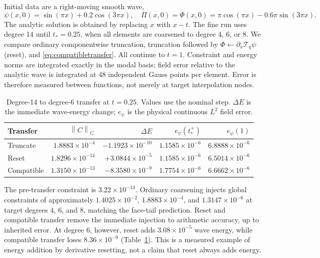 \documentclass[11pt,a4paper]{article}
\theoremstyle{remark}\newtheorem{remark}[theorem]{Remark}
\newcommand{\norm}[1]{\left\lVert #1\right\rVert}
\newcommand{\T}{\mathcal{T}}
\begin{document}
Initial data are a right-moving smooth wave,
\begin{equation}
 \psi(x,0)=\sin(\pi x)+0.2\cos(3\pi x),\quad
 \Pi(x,0)=\Phi(x,0)=\pi\cos(\pi x)-0.6\pi\sin(3\pi x).
 \label{eq:initial}
\end{equation}
The analytic solution is obtained by replacing \(x\) with \(x-t\).
The fine run uses degree 14 until \(t_*=0.25\), when all elements are
coarsened to degree 4, 6, or 8. We compare ordinary componentwise
truncation, truncation followed by \(\Phi\leftarrow\partial_x\T_q\psi\)
(reset), and \eqref{eq:compatibletransfer}. All continue to \(t=1\).
Constraint and energy norms are integrated exactly in the modal basis;
field error relative to the analytic wave is integrated at 48 independent
Gauss points per element. Error is therefore measured between functions,
not merely at target interpolation nodes.

\begin{table}[t]
\centering\small
\caption{Degree-14 to degree-6 transfer at \(t=0.25\). Values use the
nominal step. \(\Delta E\) is the immediate wave-energy change;
\(e_\psi\) is the physical continuous \(L^2\) field error.}
\label{tab:transfer}
\begin{tabular}{lrrrr}
\toprule
Transfer & \(\norm{C}_{t_*^+}\) & \(\Delta E\) & \(e_\psi(t_*^+)\) & \(e_\psi(1)\)\\
\midrule
Truncate & \(1.8883\!\times\!10^{-4}\) & \(-1.1923\!\times\!10^{-10}\) & \(1.1585\!\times\!10^{-6}\) & \(6.8888\!\times\!10^{-6}\)\\
Reset & \(1.8296\!\times\!10^{-14}\) & \(+3.0844\!\times\!10^{-5}\) & \(1.1585\!\times\!10^{-6}\) & \(6.5014\!\times\!10^{-6}\)\\
Compatible & \(1.3150\!\times\!10^{-13}\) & \(-8.3580\!\times\!10^{-9}\) & \(1.7754\!\times\!10^{-6}\) & \(6.6662\!\times\!10^{-6}\)\\
\bottomrule
\end{tabular}
\end{table}

The pre-transfer constraint is \(3.22\times10^{-13}\). Ordinary
coarsening injects global constraints of approximately \(1.4025\times10^{-2}\),
\(1.8883\times10^{-4}\), and \(1.3147\times10^{-6}\) at target degrees
4, 6, and 8, matching the face-tail prediction. Reset and compatible
transfer remove the immediate injection to arithmetic accuracy, up to
inherited error. At degree 6, however, reset adds \(3.08\times10^{-5}\)
wave energy, while compatible transfer loses \(8.36\times10^{-9}\)
(Table~\ref{tab:transfer}). This is a measured example of energy addition
by derivative resetting, not a claim that reset always adds energy.
\end{document}
